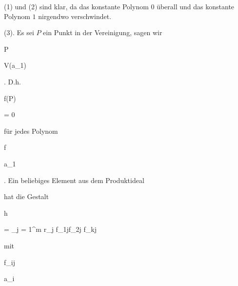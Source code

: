 {


(1) und (2) sind klar, da das konstante Polynom $0$ überall und das konstante Polynom $1$ nirgendwo verschwindet.


(3). Es sei $P$ ein Punkt in der Vereinigung, sagen wir


\mavergleichskette


{\vergleichskette


{ P
}


{ \in }{ V({\mathfrak a}_1)
}


{  }{
}


{    }{
}


{   }{
}


}
{}{}{.}
D.h.


\mavergleichskette


{\vergleichskette


{ f(P)
}


{ = }{ 0
}


{  }{
}


{    }{
}


{   }{
}


}
{}{}{}
für jedes Polynom


\mavergleichskette


{\vergleichskette


{ f
}


{ \in }{ {\mathfrak a}_1
}


{  }{
}


{    }{
}


{   }{
}


}
{}{}{.}
Ein beliebiges Element aus dem Produktideal


hat die Gestalt


\mavergleichskettedisp


{\vergleichskette


{ h
}


{ =} { \sum_{j = 1}^m r_j f_{1j}\cdot f_{2j} \cdots f_{kj}
}


{ } {
}


{ } {
}


{ } {
}


}
{}{}{}
mit


\mavergleichskette


{\vergleichskette


{ f_{ij}
}


{ \in }{ {\mathfrak a}_i
}


{  }{
}


{    }{
}


}}
